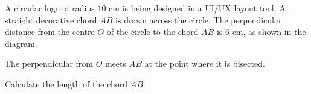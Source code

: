 \begin{question}
\noindent A circular logo of radius $10$ cm is being designed in a UI/UX layout tool. A straight decorative chord $AB$ is drawn across the circle. The perpendicular distance from the centre $O$ of the circle to the chord $AB$ is $6$ cm, as shown in the diagram.

\begin{center}
\end{center}

\noindent The perpendicular from $O$ meets $AB$ at the point where it is bisected.

\noindent Calculate the length of the chord $AB$.
\vspace{4cm}
\begin{flushright}
\end{flushright}
\end{question}

